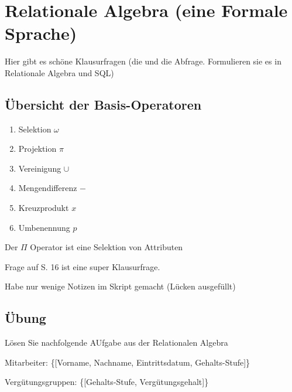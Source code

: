 \documentclass[a4paper]{article}
\title{\docTitle}
\author{Moritz}
\date{\today}
\begin{document}
\maketitle
\tableofcontents


\section{Relationale Algebra (eine Formale Sprache)}

Hier gibt es schöne Klausurfragen (die und die Abfrage. Formulieren sie es in Relationale Algebra und SQL)

\subsection{Übersicht der Basis-Operatoren}

\begin{enumerate}
    \item Selektion $\omega$
    \item Projektion $\pi$
    \item Vereinigung $\cup$
    \item Mengendifferenz $-$
    \item Kreuzprodukt $x$
    \item Umbenennung $p$
\end{enumerate}


Der $\Pi$ Operator ist eine Selektion von Attributen

Frage auf S. 16 ist eine super Klausurfrage.

Habe nur wenige Notizen im Skript gemacht (Lücken ausgefüllt)

\subsection{Übung}


Lösen Sie nachfolgende AUfgabe aus der Relationalen Algebra

Mitarbeiter: \{[Vorname, Nachname, Eintrittsdatum, Gehalts-Stufe]\}

Vergütungsgruppen: \{[Gehalts-Stufe, Vergütungsgehalt]\}
\end{document}
